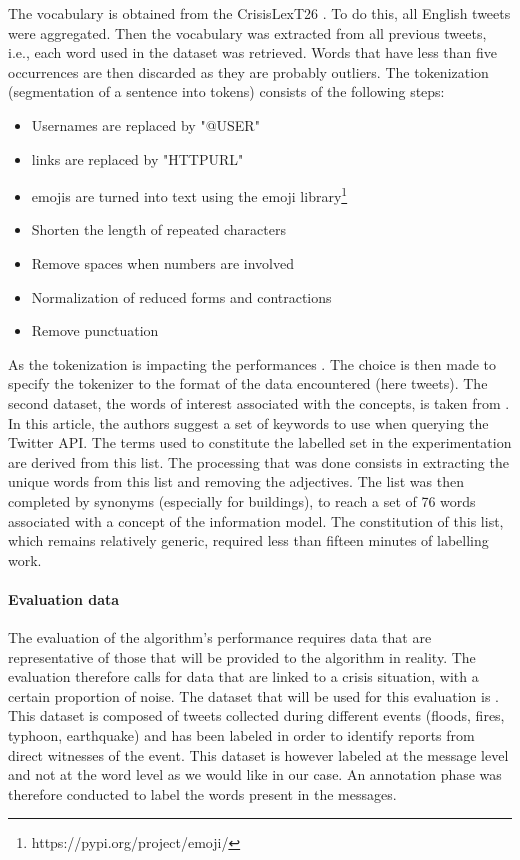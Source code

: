 The vocabulary is obtained from the CrisisLexT26 \parencite{olteanuWhatExpectWhen2015}.
To do this, all English tweets were aggregated.
Then the vocabulary was extracted from all previous tweets, i.e., each word used in the dataset was retrieved.
Words that have less than five occurrences are then discarded as they are probably outliers.
The tokenization (segmentation of a sentence into tokens) consists of the following steps:

\begin{itemize}
    \item Usernames are replaced by "@USER"
    \item links are replaced by "HTTPURL"
    \item emojis are turned into text using the emoji library\footnote{https://pypi.org/project/emoji/}
    \item Shorten the length of repeated characters
    \item Remove spaces when numbers are involved
    \item Normalization of reduced forms and contractions
    \item Remove punctuation
\end{itemize}

As the tokenization is impacting the performances \parencite[p. 21]{farzindarNaturalLanguageProcessing2017}.
The choice is then made to specify the tokenizer to the format of the data encountered (here tweets).
The second dataset, the words of interest associated with the concepts, is taken from \textcite{olteanuCrisisLexLexiconCollecting2014}.
In this article, the authors suggest a set of keywords to use when querying the Twitter API.
The terms used to constitute the labelled set in the experimentation are derived from this list.
The processing that was done consists in extracting the unique words from this list and removing the adjectives.
The list was then completed by synonyms (especially for buildings), to reach a set of 76 words associated with a concept of the information model.
The constitution of this list, which remains relatively generic, required less than fifteen minutes of labelling work.

\paragraph{Evaluation data}
The evaluation of the algorithm's performance requires data that are representative of those that will be provided to the algorithm in reality.
The evaluation therefore calls for data that are linked to a crisis situation, with a certain proportion of noise.
The dataset that will be used for this evaluation is \textcite{zahraAutomaticIdentificationEyewitness2020}.
This dataset is composed of tweets collected during different events (floods, fires, typhoon, earthquake)
and has been labeled in order to identify reports from direct witnesses of the event.
This dataset is however labeled at the message level and not at the word level as we would like in our case.
An annotation phase was therefore conducted to label the words present in the messages.


